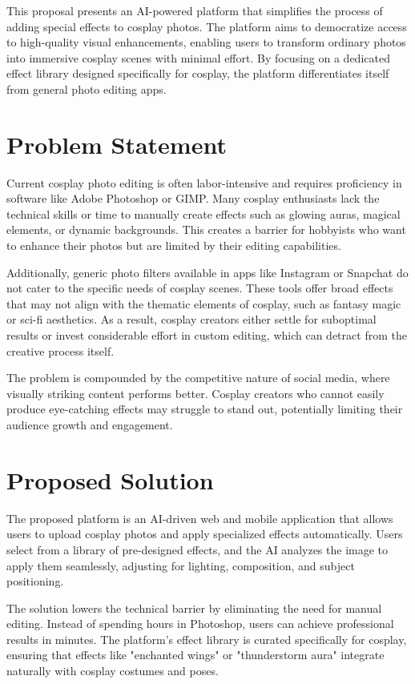 \documentclass[12pt]{article}
\begin{document}
This proposal presents an AI-powered platform that simplifies the process of adding special effects to cosplay photos. The platform aims to democratize access to high-quality visual enhancements, enabling users to transform ordinary photos into immersive cosplay scenes with minimal effort. By focusing on a dedicated effect library designed specifically for cosplay, the platform differentiates itself from general photo editing apps.

\section{Problem Statement}

Current cosplay photo editing is often labor-intensive and requires proficiency in software like Adobe Photoshop or GIMP. Many cosplay enthusiasts lack the technical skills or time to manually create effects such as glowing auras, magical elements, or dynamic backgrounds. This creates a barrier for hobbyists who want to enhance their photos but are limited by their editing capabilities.

Additionally, generic photo filters available in apps like Instagram or Snapchat do not cater to the specific needs of cosplay scenes. These tools offer broad effects that may not align with the thematic elements of cosplay, such as fantasy magic or sci-fi aesthetics. As a result, cosplay creators either settle for suboptimal results or invest considerable effort in custom editing, which can detract from the creative process itself.

The problem is compounded by the competitive nature of social media, where visually striking content performs better. Cosplay creators who cannot easily produce eye-catching effects may struggle to stand out, potentially limiting their audience growth and engagement.

\section{Proposed Solution}

The proposed platform is an AI-driven web and mobile application that allows users to upload cosplay photos and apply specialized effects automatically. Users select from a library of pre-designed effects, and the AI analyzes the image to apply them seamlessly, adjusting for lighting, composition, and subject positioning.

The solution lowers the technical barrier by eliminating the need for manual editing. Instead of spending hours in Photoshop, users can achieve professional results in minutes. The platform's effect library is curated specifically for cosplay, ensuring that effects like "enchanted wings" or "thunderstorm aura" integrate naturally with cosplay costumes and poses.
\end{document}
